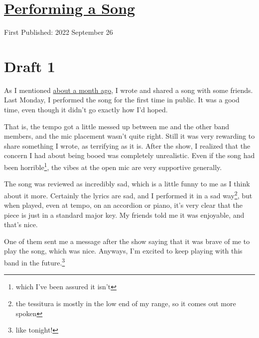 \documentclass[12pt]{article}[titlepage]
\newcommand{\1}{\={a}}
\newcommand{\2}{\={e}}
\newcommand{\3}{\={\i}}
\newcommand{\4}{\=o}
\newcommand{\5}{\=u}
\newcommand{\6}{\={A}}
\renewcommand{\,}{\textsuperscript{,}}
\begin{document}
\doublespacing
\section{\href{performing-a-song.html}{Performing a Song}}
First Published: 2022 September 26
\section{Draft 1}
As I mentioned \href{sharing-a-song.html}{about a month ago}, I wrote and shared a song with some friends.
Last Monday, I performed the song for the first time in public.
It was a good time, even though it didn't go exactly how I'd hoped.

That is, the tempo got a little messed up between me and the other band members, and the mic placement wasn't quite right.
Still it was very rewarding to share something I wrote, as terrifying as it is.
After the show, I realized that the concern I had about being booed was completely unrealistic.
Even if the song had been horrible\footnote{which I've been assured it isn't}, the vibes at the open mic are very supportive generally.

The song was reviewed as incredibly sad, which is a little funny to me as I think about it more.
Certainly the lyrics are sad, and I performed it in a sad way\footnote{the tessitura is mostly in the low end of my range, so it comes out more spoken}, but when played, even at tempo, on an accordion or piano, it's very clear that the piece is just in a standard major key.
My friends told me it was enjoyable, and that's nice.

One of them sent me a message after the show saying that it was brave of me to play the song, which was nice.
Anyways, I'm excited to keep playing with this band in the future.\footnote{like tonight!}
\end{document}
